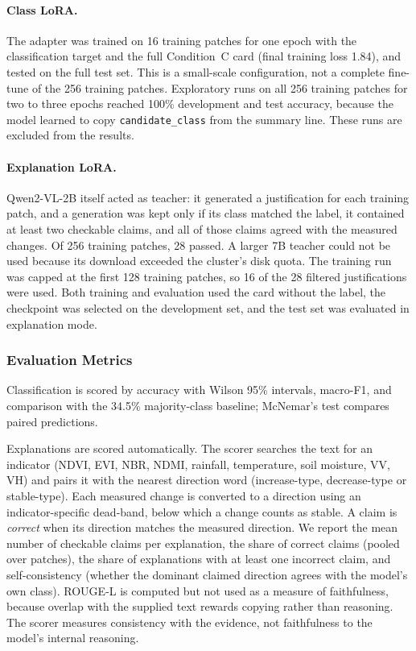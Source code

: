 \paragraph{Class LoRA.} The adapter was trained on 16 training patches
for one epoch with the classification target and the full Condition~C
card (final training loss 1.84), and tested on the full test set. This
is a small-scale configuration, not a complete fine-tune of the 256
training patches. Exploratory runs on all 256 training patches for two
to three epochs reached 100\% development and test accuracy, because
the model learned to copy \texttt{candidate\_class} from the summary
line. These runs are excluded from the results.

\paragraph{Explanation LoRA.} Qwen2-VL-2B itself acted as teacher: it
generated a justification for each training patch, and a generation was
kept only if its class matched the label, it contained at least two
checkable claims, and all of those claims agreed with the measured
changes. Of 256 training patches, 28 passed. A larger 7B teacher could
not be used because its download exceeded the cluster's disk quota. The
training run was capped at the first 128 training patches, so 16 of the
28 filtered justifications were used. Both training and evaluation used
the card without the label, the checkpoint was selected on the
development set, and the test set was evaluated in explanation mode.

\subsubsection{Evaluation Metrics}

Classification is scored by accuracy with Wilson 95\% intervals, macro-F1, and comparison with the 34.5\%
majority-class baseline; McNemar's test  compares
paired predictions.

Explanations are scored automatically. The scorer searches the text for
an indicator (NDVI, EVI, NBR, NDMI, rainfall, temperature, soil
moisture, VV, VH) and pairs it with the nearest direction word
(increase-type, decrease-type or stable-type). Each measured change is
converted to a direction using an indicator-specific dead-band, below
which a change counts as stable. A claim is \emph{correct} when its
direction matches the measured direction. We report the mean number of
checkable claims per explanation, the share of correct claims (pooled
over patches), the share of explanations with at least one incorrect
claim, and self-consistency (whether the dominant claimed direction
agrees with the model's own class). ROUGE-L  is
computed but not used as a measure of faithfulness, because overlap with
the supplied text rewards copying rather than reasoning. The scorer measures consistency with the evidence,
not faithfulness to the model's internal reasoning.

